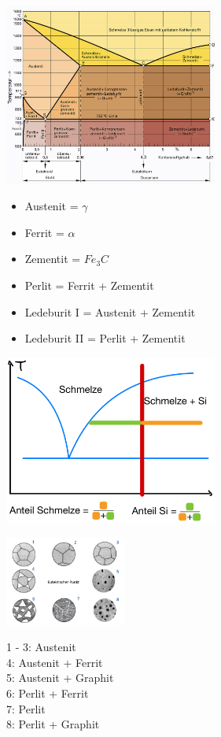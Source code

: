 \includegraphics[width = 70mm]{src/images/Eisenkohlenstoffdiagramm.png}
\begin{minipage}{0.39\linewidth}
    \begin{itemize}
        \item Austenit = $\gamma$\\
        \item Ferrit = $\alpha$\\
        \item Zementit = $Fe_3C$\\
    \end{itemize}
\end{minipage}
\begin{minipage}{0.62\linewidth}
    \begin{itemize}
        \item Perlit = Ferrit + Zementit\\
        \item Ledeburit I = Austenit + Zementit\\
        \item Ledeburit II = Perlit + Zementit\\    
    \end{itemize}
\end{minipage}

\includegraphics[width = 70mm]{src/images/Hebelgesetz.jpeg}

\begin{minipage}{0.6\linewidth}
    \includegraphics[width = 40mm]{src/images/Kreisli.png}
\end{minipage}
\begin{minipage}{0.4\linewidth}
    1 - 3: Austenit\\
    4: Austenit + Ferrit\\
    5: Austenit + Graphit\\
    6: Perlit + Ferrit\\
    7: Perlit\\
    8: Perlit + Graphit\\
\end{minipage}

